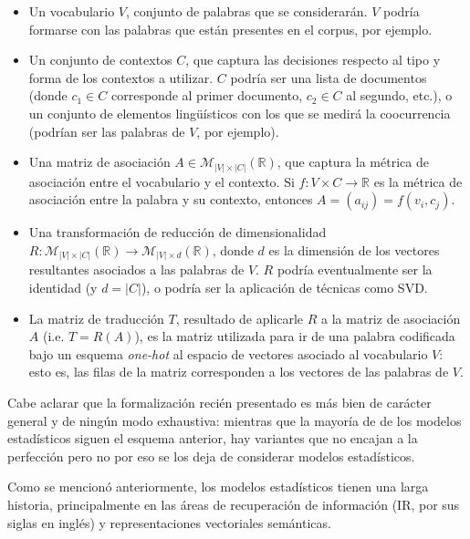 \begin{itemize}

\item Un vocabulario $V$, conjunto de palabras que se considerarán. $V$ podría formarse con las palabras
que están presentes en el corpus, por ejemplo.

\item Un conjunto de contextos $C$, que captura las decisiones respecto al tipo y forma de los
contextos a utilizar. $C$ podría ser una lista de documentos (donde $c_1 \in C$ corresponde al
primer documento, $c_2 \in C$ al segundo, etc.), o un conjunto de elementos lingüísticos con los que
se medirá la coocurrencia (podrían ser las palabras de $V$, por ejemplo).

\item Una matriz de asociación $A \in \mathcal{M}_{|V| \times |C|}(\mathbb{R})$, que captura la
métrica de asociación entre el vocabulario y el contexto. Si $f: V \times C \to \mathbb{R}$ es la
métrica de asociación entre la palabra y su contexto, entonces $A = (a_{ij}) = f(v_i, c_j)$.

\item Una transformación de reducción de dimensionalidad $R: \mathcal{M}_{|V| \times
|C|}(\mathbb{R}) \to \mathcal{M}_{|V| \times d}(\mathbb{R})$, donde $d$ es la dimensión de los
vectores resultantes asociados a las palabras de $V$. $R$ podría eventualmente ser la identidad (y
$d = |C|$), o podría ser la aplicación de técnicas como SVD\@.

\item La matriz de traducción $T$, resultado de aplicarle $R$ a la matriz de asociación $A$ (i.e. $T
= R(A)$), es la matriz utilizada para ir de una palabra codificada bajo un esquema \textit{one-hot}
al espacio de vectores asociado al vocabulario $V$: esto es, las filas de la matriz corresponden a
los vectores de las palabras de $V$.

\end{itemize}

Cabe aclarar que la formalización recién presentado es más bien de carácter general y de ningún modo
exhaustiva: mientras que la mayoría de de los modelos estadísticos siguen el esquema anterior, hay
variantes que no encajan a la perfección pero no por eso se los deja de considerar modelos
estadísticos.


Como se mencionó anteriormente, los modelos estadísticos tienen una larga historia, principalmente
en las áreas de recuperación de información (IR, por sus siglas en inglés) y representaciones
vectoriales semánticas.

